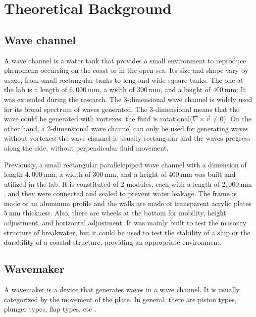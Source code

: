 \section{Theoretical Background}

\subsection{Wave channel}

A wave channel is a water tank that provides a small environment to reproduce phenomena occurring on the coast or in the open sea. Its size and shape vary by usage, from small rectangular tanks to long and wide square tanks. The one at the lab is a length of $6,000\mathrm{~mm}$, a width of $300\mathrm{~mm}$, and a height of $400\mathrm{~mm}$: It was extended during the research. The 3-dimensional wave channel is widely used for its broad spectrum of waves generated. The 3-dimensional means that the wave could be generated with vortexes: the fluid is rotational($\nabla \times \vec{v} \neq 0$). On the other hand, a 2-dimensional wave channel can only be used for generating waves without vortexes: the wave channel is usually rectangular and the waves progress along the side, without perpendicular fluid movement.

Previously, a small rectangular parallelepiped wave channel with a dimension of length $4,000\mathrm{~mm}$, a width of $300\mathrm{~mm}$, and a height of $400\mathrm{~mm}$ was built and utilized in the lab. It is constituted of 2 modules, each with a length of $2,000\mathrm{~mm}$, and they were connected and sealed to prevent water leakage. The frame is made of an aluminum profile and the walls are made of transparent acrylic plates $5\mathrm{~mm}$ thickness. Also, there are wheels at the bottom for mobility, height adjustment, and horizontal adjustment. It was mainly built to test the masonry structure of breakwater, but it could be used to test the stability of a ship or the durability of a coastal structure, providing an appropriate environment.

\subsection{Wavemaker}

A wavemaker is a device that generates waves in a wave channel. It is usually categorized by the movement of the plate. In general, there are piston types, plunger types, flap types, etc \cite{Edinburgh_Designs_Ltd_2016}.

